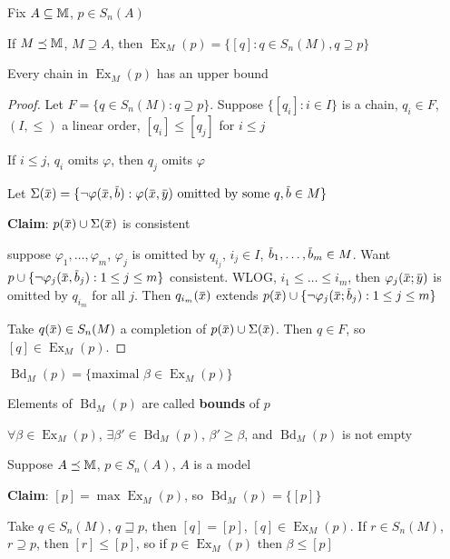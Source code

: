 \documentclass[11pt]{article}
\DeclareMathOperator{\Ex}{Ex}
\DeclareMathOperator{\Bd}{Bd}
\begin{document}
Fix \(A\subseteq\mathbb{M}\), \(p\in S_n(A)\)

\begin{definition}[]
If \(M\preceq\mathbb{M}\), \(M\supseteq A\), then \(\Ex_M(p)=\{[q]:q\in S_n(M), q\supseteq p\}\)
\end{definition}

\begin{lemma}[]
\label{3.31.11}
Every chain in \(\Ex_M(p)\) has an upper bound
\end{lemma}

\begin{proof}
Let \(F=\{q\in S_n(M):q\supseteq p\}\). Suppose \(\{[q_i]:i\in I\}\) is a chain, \(q_i\in F\), \((I,\le)\) a linear
order, \([q_i]\le[q_j]\) for \(i\le j\)

If \(i\le j\), \(q_i\) omits \(\varphi\), then \(q_j\) omits \(\varphi\)

Let \(\Sigma(\barx)=\{\neg\varphi(\barx,\barb):\varphi(\barx,\bary)\text{ omitted by some }q, \barb\in M\}\)

\textbf{Claim}: \(p(\barx)\cup\Sigma(\barx)\) is consistent

suppose \(\varphi_1,\dots,\varphi_m\), \(\varphi_j\) is omitted by \(q_{i_j}\), \(i_j\in I\), \(\barb_1,\dots,\barb_m\in M\).
Want \(p\cup\{\neg\varphi_j(\barx,\barb_j):1\le j\le m\}\) consistent. WLOG, \(i_1\le\dots\le i_m\),
then \(\varphi_j(\barx;\bary)\) is omitted by \(q_{i_m}\) for all \(j\). Then \(q_{i_m}(\barx)\)
extends \(p(\barx)\cup\{\neg\varphi_j(\barx;\barb_j):1\le j\le m\}\)

Take \(q(\barx)\in S_n(M)\) a completion of \(p(\barx)\cup\Sigma(\barx)\). Then \(q\in F\),
so \([q]\in\Ex_M(p)\).
\end{proof}

\begin{definition}[]
\(\Bd_M(p)=\{\text{maximal }\beta\in\Ex_M(p)\}\)

Elements of \(\Bd_M(p)\) are called \textbf{bounds} of \(p\)
\end{definition}

\begin{corollary}[]
\label{3.31.13}
\(\forall\beta\in\Ex_M(p)\), \(\exists\beta'\in\Bd_M(p)\), \(\beta'\ge\beta\), and \(\Bd_M(p)\) is not empty
\end{corollary}

\begin{examplle}[]
Suppose \(A\preceq\mathbb{M}\), \(p\in S_n(A)\), \(A\) is a model

\textbf{Claim}: \([p]=\max\Ex_M(p)\), so \(\Bd_M(p)=\{[p]\}\)

Take \(q\in S_n(M)\), \(q\sqsupseteq p\), then \([q]=[p]\), \([q]\in\Ex_M(p)\).
If \(r\in S_n(M)\), \(r\supseteq p\), then \([r]\le[p]\), so if \(p\in\Ex_M(p)\) then \(\beta\le[p]\)
\end{examplle}
\end{document}
